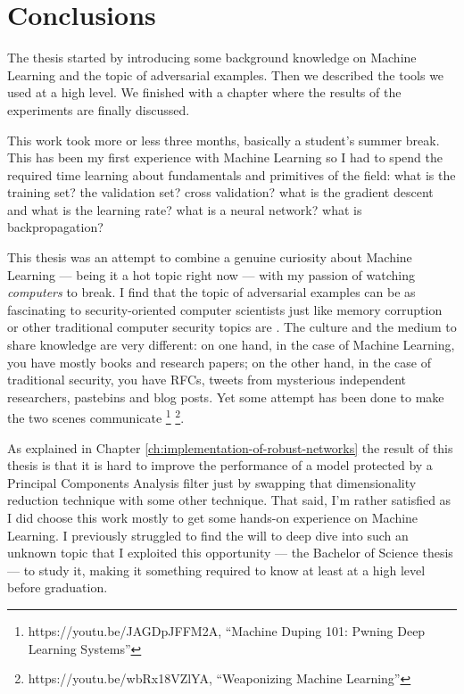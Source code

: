 \chapter*{Conclusions}

The thesis started by introducing some background knowledge on Machine
Learning and the topic of adversarial examples. Then we described the
tools we used at a high level. We finished with a chapter where the
results of the experiments are finally discussed.

This work took more or less three months, basically a student's summer
break. This has been my first experience with Machine Learning so I had
to spend the required time learning about fundamentals and primitives
of the field: what is the training set? the validation set? cross
validation? what is the gradient descent and what is the learning rate?
what is a neural network? what is backpropagation?

This thesis was an attempt to combine a genuine curiosity about Machine
Learning --- being it a hot topic right now --- with my passion of
watching \emph{computers} to break. I find that the topic of
adversarial examples can be as fascinating to security-oriented
computer scientists just like memory corruption or other traditional
computer security topics are \cite{DBLP:journals/corr/PapernotMSW16}.
The culture and the medium to share knowledge are very different: on
one hand, in the case of Machine Learning, you have mostly books and
research papers; on the other hand, in the case of traditional
security, you have RFCs, tweets from mysterious independent
researchers, pastebins and blog posts. Yet some attempt has been done
to make the two scenes communicate%
\footnote{https://youtu.be/JAGDpJFFM2A, ``Machine Duping 101: Pwning
  Deep Learning Systems''}
\footnote{https://youtu.be/wbRx18VZlYA, ``Weaponizing Machine
  Learning''}.

As explained in Chapter \ref{ch:implementation-of-robust-networks} the
result of this thesis is that it is hard to improve the performance of
a model protected by a Principal Components Analysis filter just by
swapping that dimensionality reduction technique with some other
technique. That said, I'm rather satisfied as I did choose this work
mostly to get some hands-on experience on Machine Learning. I
previously struggled to find the will to deep dive into such an
unknown topic that I exploited this opportunity --- the Bachelor of
Science thesis --- to study it, making it something required to know at
least at a high level before graduation.
